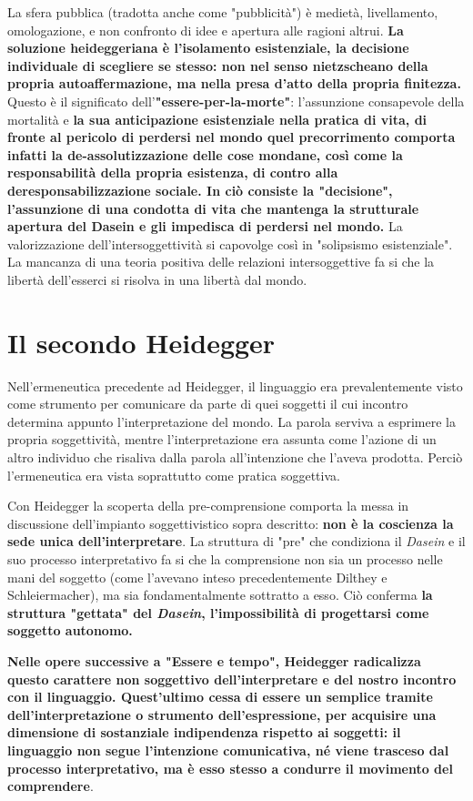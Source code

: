 La sfera pubblica (tradotta anche come "pubblicità") è
medietà, livellamento, omologazione, e non confronto
di idee e apertura alle ragioni altrui.
\textbf{La soluzione heideggeriana è l'isolamento
esistenziale, la decisione individuale di
scegliere se stesso: non nel senso nietzscheano
della propria autoaffermazione, ma nella presa
d'atto della propria finitezza.} Questo è il
significato dell'\textbf{"essere-per-la-morte"}: l'assunzione
consapevole della mortalità e \textbf{la sua anticipazione
esistenziale nella pratica di vita, di fronte al
pericolo di perdersi nel mondo quel precorrimento
comporta infatti la de-assolutizzazione delle cose
mondane, così come la responsabilità della propria
esistenza, di contro alla deresponsabilizzazione
sociale. In ciò consiste la "decisione", l'assunzione di una condotta di vita che mantenga
la strutturale apertura del Dasein e gli impedisca
di perdersi nel mondo.} La valorizzazione dell'intersoggettività si capovolge così in
"solipsismo esistenziale". La mancanza di una
teoria positiva delle relazioni intersoggettive
fa si che la libertà dell'esserci si risolva in
una libertà dal mondo.

\section{Il secondo Heidegger}

Nell'ermeneutica precedente ad Heidegger, il linguaggio era
prevalentemente visto come strumento per
comunicare da parte di quei soggetti il cui incontro
determina appunto l'interpretazione del mondo. La
parola serviva a esprimere la propria soggettività, mentre
l'interpretazione era assunta come l'azione di un altro
individuo che risaliva dalla parola all'intenzione che
l'aveva prodotta. Perciò l'ermeneutica era vista soprattutto
come pratica soggettiva.

Con Heidegger la scoperta della pre-comprensione comporta
la messa in discussione dell'impianto soggettivistico
sopra descritto: \textbf{non è la coscienza la sede unica dell'interpretare}. La struttura di "pre" che condiziona
il \textit{Dasein} e il suo processo interpretativo fa si che
la comprensione non sia un processo nelle mani del
soggetto (come l'avevano inteso precedentemente Dilthey e
Schleiermacher), ma sia fondamentalmente sottratto a
esso. Ciò conferma \textbf{la struttura "gettata" del
\textit{Dasein}, l'impossibilità di progettarsi come soggetto
autonomo.}

\textbf{Nelle opere successive a "Essere e tempo",
Heidegger radicalizza questo carattere non
soggettivo dell'interpretare e del nostro incontro
con il linguaggio. Quest'ultimo cessa di essere
un semplice tramite dell'interpretazione o strumento
dell'espressione, per acquisire una dimensione di
sostanziale indipendenza rispetto ai soggetti: il linguaggio
non segue l'intenzione comunicativa, né viene
trasceso dal processo interpretativo, ma è esso stesso a
condurre il movimento del comprendere}.

